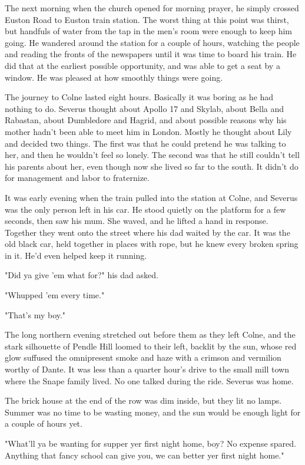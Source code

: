 The next morning when the church opened for morning prayer, he simply crossed Euston Road to Euston train station. The worst thing at this point was thirst, but handfuls of water from the tap in the men's room were enough to keep him going. He wandered around the station for a couple of hours, watching the people and reading the fronts of the newspapers until it was time to board his train. He did that at the earliest possible opportunity, and was able to get a seat by a window. He was pleased at how smoothly things were going.

The journey to Colne lasted eight hours. Basically it was boring as he had nothing to do. Severus thought about Apollo 17 and Skylab, about Bella and Rabastan, about Dumbledore and Hagrid, and about possible reasons why his mother hadn't been able to meet him in London. Mostly he thought about Lily and decided two things. The first was that he could pretend he was talking to her, and then he wouldn't feel so lonely. The second was that he still couldn't tell his parents about her, even though now she lived so far to the south. It didn't do for management and labor to fraternize.

It was early evening when the train pulled into the station at Colne, and Severus was the only person left in his car. He stood quietly on the platform for a few seconds, then saw his mum. She waved, and he lifted a hand in response. Together they went onto the street where his dad waited by the car. It was the old black car, held together in places with rope, but he knew every broken spring in it. He'd even helped keep it running.

"Did ya give 'em what for?" his dad asked.

"Whupped 'em every time."

"That's my boy."

The long northern evening stretched out before them as they left Colne, and the stark silhouette of Pendle Hill loomed to their left, backlit by the sun, whose red glow suffused the omnipresent smoke and haze with a crimson and vermilion worthy of Dante. It was less than a quarter hour's drive to the small mill town where the Snape family lived. No one talked during the ride. Severus was home.

The brick house at the end of the row was dim inside, but they lit no lamps. Summer was no time to be wasting money, and the sun would be enough light for a couple of hours yet.

"What'll ya be wanting for supper yer first night home, boy? No expense spared. Anything that fancy school can give you, we can better yer first night home."

